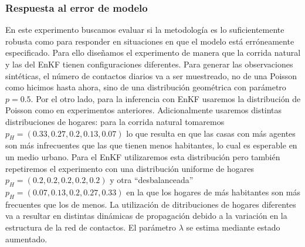 \subsubsection{Respuesta al error de modelo}

En este experimento buscamos evaluar si la metodología es lo suficientemente robusta como para responder en situaciones en que el modelo está erróneamente especificado. Para ello diseñamos el experimento de manera que la corrida natural y las del EnKF tienen configuraciones diferentes. Para generar las observaciones sintéticas, el número de contactos diarios va a ser muestreado, no de una Poisson como hicimos hasta ahora, sino de una distribución geométrica con parámetro $p = 0.5$. Por el otro lado, para la inferencia con EnKF usaremos la distribución de Poisson como en experimentos anteriores. Adicionalmente usaremos distintas distribuciones de hogares: para la corrida natural tomaremos $p_H = (0.33, 0.27, 0.2, 0.13, 0.07)$ lo que resulta en que las casas con más agentes son más infrecuentes que las que tienen menos habitantes, lo cual es esperable en un medio urbano. Para el EnKF utilizaremos esta distribución pero también repetiremos el experimento con una distribución uniforme de hogares $p_H = (0.2, 0.2, 0.2, 0.2, 0.2)$ y otra ``desbalanceada'' $p_H = (0.07, 0.13, 0.2, 0.27, 0.33)$ en la que los hogares de más habitantes son más frecuentes que los de menos. La utilización de ditribuciones de hogares diferentes va a resultar en distintas dinámicas de propagación debido a la variación en la estructura de la red de contactos. El parámetro $\lambda$ se estima mediante estado aumentado.

